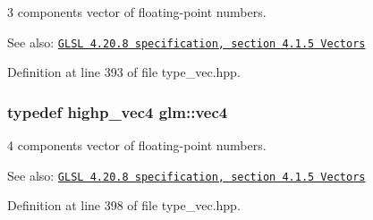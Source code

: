 3 components vector of floating-point numbers.

\begin{Desc}
\item[See also:]\href{http://www.opengl.org/registry/doc/GLSLangSpec.4.20.8.pdf}{\tt GLSL 4.20.8 specification, section 4.1.5 Vectors} \end{Desc}


Definition at line 393 of file type\_\-vec.hpp.\hypertarget{group__core__types_g5881b1b022d7fd1b7218f5916532dd02}{
\subsubsection[vec4]{\setlength{\rightskip}{0pt plus 5cm}typedef highp\_\-vec4 {\bf glm::vec4}}}
\label{group__core__types_g5881b1b022d7fd1b7218f5916532dd02}


4 components vector of floating-point numbers.

\begin{Desc}
\item[See also:]\href{http://www.opengl.org/registry/doc/GLSLangSpec.4.20.8.pdf}{\tt GLSL 4.20.8 specification, section 4.1.5 Vectors} \end{Desc}


Definition at line 398 of file type\_\-vec.hpp.